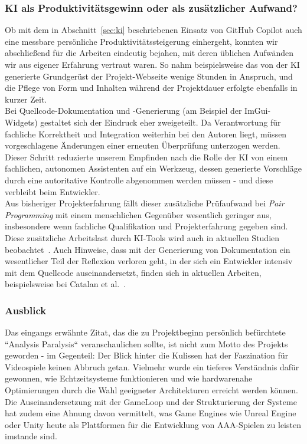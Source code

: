 \subsubsection{KI als Produktivitätsgewinn oder als zusätzlicher Aufwand?}

Ob mit dem in Abschnitt~\ref{sec:ki} beschriebenen Einsatz von GitHub Copilot auch eine messbare persönliche Produktivitätssteigerung einhergeht, konnten wir abschließend für die Arbeiten eindeutig bejahen, mit deren üblichen Aufwänden wir aus eigener Erfahrung vertraut waren.
So nahm beispielsweise das von der KI generierte Grundgerüst der Projekt-Webseite wenige Stunden in Anspruch, und die Pflege von Form und Inhalten während der Projektdauer erfolgte ebenfalls in kurzer Zeit.\\

Bei Quellcode-Dokumentation und -Generierung (am Beispiel der ImGui-Widgets) gestaltet sich der Eindruck eher zweigeteilt.
Da Verantwortung für fachliche Korrektheit und Integration weiterhin bei den Autoren liegt, müssen vorgeschlagene Änderungen einer erneuten Überprüfung unterzogen werden.
Dieser Schritt reduzierte unserem Empfinden nach die Rolle der KI von einem fachlichen, autonomen Assistenten auf ein Werkzeug, dessen generierte Vorschläge durch eine autoritative Kontrolle abgenommen werden müssen - und diese verbleibt beim Entwickler.\\

Aus bisheriger Projekterfahrung fällt dieser zusätzliche Prüfaufwand bei \textit{Pair Programming} mit einem menschlichen Gegenüber wesentlich geringer aus, insbesondere wenn fachliche Qualifikation und Projekterfahrung gegeben sind.
Diese zusätzliche Arbeitslast durch KI-Tools wird auch in aktuellen Studien beobachtet~\cite{METRStudy}.
Auch Hinweise, dass mit der Generierung von Dokumentation ein wesentlicher Teil der Reflexion verloren geht, in der sich ein Entwickler intensiv mit dem Quellcode auseinandersetzt, finden sich in aktuellen Arbeiten, beispielsweise bei Catalan et al.~\cite{CDMK26}.

\subsubsection{Ausblick}

Das eingangs erwähnte Zitat, das die zu Projektbeginn persönlich befürchtete ``Analysis Paralysis`` veranschaulichen sollte, ist nicht zum Motto des Projekts geworden - im Gegenteil:
Der Blick hinter die Kulissen hat der Faszination für Videospiele keinen Abbruch getan.
Vielmehr wurde ein tieferes Verständnis dafür gewonnen, wie Echtzeitsysteme funktionieren und wie hardwarenahe Optimierungen durch die Wahl geeigneter Architekturen erreicht werden können.
Die Auseinandersetzung mit der GameLoop und der Strukturierung der Systeme hat zudem eine Ahnung davon vermittelt, was Game Engines wie Unreal Engine oder Unity heute als Plattformen für die Entwicklung von AAA-Spielen zu leisten imstande sind.\\

